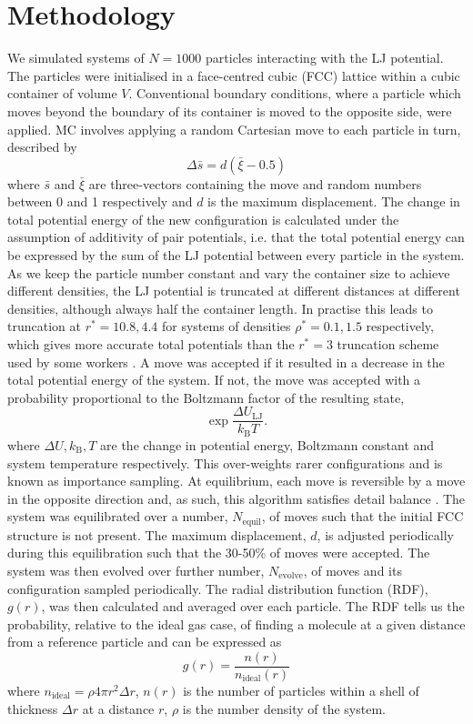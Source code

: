 \documentclass[10pt, twocolumn]{revtex4}    %
\begin{document}
\section{Methodology} \label{s:methods}
We simulated systems of $N=1000$ particles interacting with the LJ potential. The particles were initialised in a face-centred cubic (FCC) lattice within a cubic container of volume $V$. Conventional boundary conditions, where a particle which moves beyond the boundary of its container is moved to the opposite side, were applied.
MC involves applying a random Cartesian move to each particle in turn, described by
\begin{displaymath}
\Delta{}\bar{s} = d\left(\bar{\xi}-0.5\right)
\end{displaymath}
where $\bar{s}$ and $\bar{\xi}$ are three-vectors containing the move and random numbers between 0 and 1 respectively and $d$ is the maximum displacement.
The change in total potential energy of the new configuration is calculated under the assumption of additivity of pair potentials, i.e. that the total potential energy can be expressed by the sum of the LJ potential between every particle in the system. As we keep the particle number constant and vary the container size to achieve different densities, the LJ potential is truncated at different distances at different densities, although always half the container length. In practise this leads to truncation at $r^{*}=10.8, 4.4$ for systems of densities $\rho{}^{*}=0.1, 1.5$ respectively, which gives more accurate total potentials than the $r^{*}=3$ truncation scheme used by some workers \cite{NIST}.
A move was accepted if it resulted in a decrease in the total potential energy of the system. If not, the move was accepted with a probability proportional to the Boltzmann factor of the resulting state,
\begin{displaymath}
\exp{\frac{\Delta{}U_\text{LJ}}{k_\text{B}T}}.
\end{displaymath}
where $\Delta{}U, k_\text{B}, T$ are the change in potential energy, Boltzmann constant and system temperature respectively.
This over-weights rarer configurations and is known as importance sampling. At equilibrium, each move is reversible by a move in the opposite direction and, as such, this algorithm satisfies detail balance \cite{CompSimLiq}.
The system was equilibrated over a number, $N_\text{equil}$, of moves such that the initial FCC structure is not present. The maximum displacement, $d$, is adjusted periodically during this equilibration such that the 30-50\% of moves were accepted.
The system was then evolved over further number, $N_\text{evolve}$, of moves and its configuration sampled periodically. The radial distribution function (RDF), $g(r)$, was then calculated and averaged over each particle. The RDF tells us the probability, relative to the ideal gas case, of finding a molecule at a given distance from a reference particle and can be expressed as
\begin{displaymath}
g(r) = \frac{n(r)}{n_\text{ideal}(r)}
\end{displaymath}
where $n_\text{ideal} = \rho{}4\pi{}r^{2}\Delta{}r$, $n(r)$ is the number of particles within a shell of thickness $\Delta{}r$ at a distance $r$, $\rho{}$ is the number density of the system.
\end{document}
